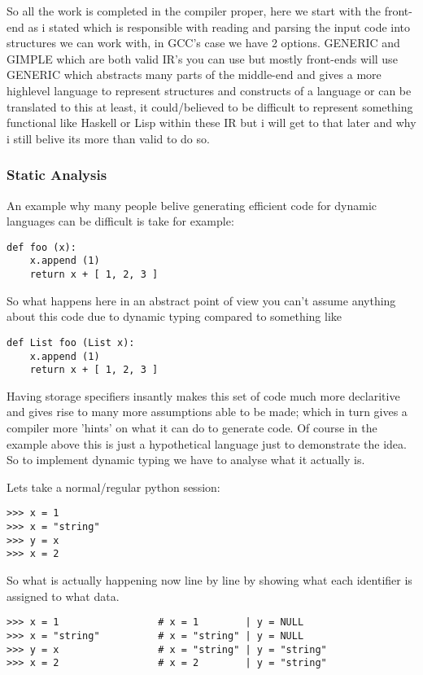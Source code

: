 \documentclass[defaultstyle,11pt]{article}
\begin{document}
So all the work is completed in the compiler proper, here we start with the front-end as i stated which is
responsible with reading and parsing the input code into structures we can work with, in GCC's case we have 2
options. GENERIC and GIMPLE which are both valid IR's you can use but mostly front-ends will use GENERIC which
abstracts many parts of the middle-end and gives a more highlevel language to represent structures and constructs
of a language or can be translated to this at least, it could/believed to be difficult to represent something functional
like Haskell or Lisp within these IR but i will get to that later and why i still belive its more than valid to do so.

\subsubsection{Static Analysis}

An example why many people belive generating efficient code for dynamic languages can be difficult is take for example:

\begin{lstlisting}
def foo (x):
    x.append (1)
    return x + [ 1, 2, 3 ]
\end{lstlisting}

So what happens here in an abstract point of view you can't assume anything about this code due to dynamic typing
compared to something like

\begin{lstlisting}
def List foo (List x):
    x.append (1)
    return x + [ 1, 2, 3 ]
\end{lstlisting}

Having storage specifiers insantly makes this set of code much more declaritive and gives rise to many more assumptions
able to be made; which in turn gives a compiler more 'hints' on what it can do to generate code. Of course in the example
above this is just a hypothetical language just to demonstrate the idea. So to implement dynamic typing we have to analyse
what it actually is.

Lets take a normal/regular python session:

\begin{lstlisting}
>>> x = 1
>>> x = "string"
>>> y = x
>>> x = 2
\end{lstlisting}

So what is actually happening now line by line by showing what each identifier is assigned to what data.

\begin{lstlisting}
>>> x = 1                 # x = 1        | y = NULL
>>> x = "string"          # x = "string" | y = NULL
>>> y = x                 # x = "string" | y = "string"
>>> x = 2                 # x = 2        | y = "string"
\end{lstlisting}
\end{document}
